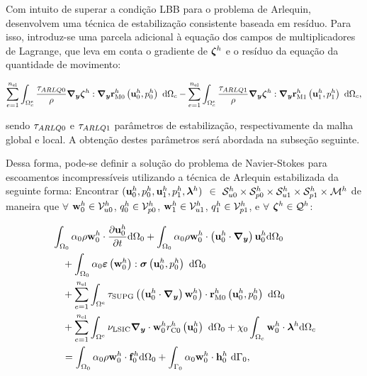 \documentclass[tese_patricia]{subfiles}
\begin{document}
Com intuito de superar a condição LBB para o problema de Arlequin,  desenvolvem uma técnica de estabilização consistente baseada em resíduo. Para isso, introduz-se uma parcela adicional à equação dos campos de multiplicadores de Lagrange, que leva em conta o gradiente de $\boldsymbol{\zeta}^h$ e o resíduo da equação da quantidade de movimento:

\begin{align}
	\sum_{e=1}^{n_{\mathrm{el}}} \int_{\Omega^e_{c}} \frac{\tau_{ARLQ0}}{\rho} \boldsymbol{\nabla_y} \boldsymbol{\zeta}^h : \boldsymbol{\nabla_y} \mathbf{r}_{\mathrm{M0}}^{h}\left(\mathbf{u}_0^h,p_0^h \right) \ \mathrm{d} \Omega_c - 
	\sum_{e=1}^{n_{\mathrm{el}}} \int_{\Omega^e_{c}} \frac{\tau_{ARLQ1}}{\rho} \boldsymbol{\nabla_y} \boldsymbol{\zeta}^h : \boldsymbol{\nabla_y} \mathbf{r}_{\mathrm{M1}}^{h}\left(\mathbf{u}_1^h,p_1^h \right) \ \mathrm{d} \Omega_c,
\end{align}

\noindent sendo $\tau_{ARLQ0}$ e $\tau_{ARLQ1}$ parâmetros de estabilização, respectivamente da malha global e local. A obtenção destes parâmetros será abordada na subseção seguinte. 

Dessa forma, pode-se definir a solução do problema de Navier-Stokes para escoamentos incompressíveis utilizando a técnica de Arlequin estabilizada da seguinte forma: Encontrar $(\mathbf{u}_0^h,p_0^h,\mathbf{u}_1^h,p_1^h,\boldsymbol{\lambda}^h)$ $\in$ $\mathcal{S}_{u0}^h \times \mathcal{S}_{p0}^h \times \mathcal{S}_{u1}^h \times \mathcal{S}_{p1}^h \times \mathcal{M}^h$ de maneira que  $\forall$ $\mathbf{w}_0^h \in \mathcal{V}_{u0}^h$, $q_0^h \in \mathcal{V}_{p0}^h$, $\mathbf{w}_1^h \in \mathcal{V}_{u1}^h$, $q_1^h \in \mathcal{V}_{p1}^h$,   e $\forall$ $\boldsymbol{\zeta}^h \in \mathcal{Q}^h$:

\begin{align}
	\begin{split}
		&\int_{\globalModel} \arlequinWFGlobal \density \wglobalh \cdot \frac{\partial\uglobalh}{\partial t} \deriv \globalModel +
		\int_{\globalModel} \arlequinWFGlobal \density \wglobalh \cdot  \left(\uglobalh \cdot \gradient \right) \uglobalh \deriv \globalModel  \\ 
		&\quad+	
		\int_{\globalModel} \arlequinWFGlobal \straintensor \left(\wglobalh\right) : \stresstensor \left(\uglobalh,\pglobalh\right)\ \deriv \globalModel \\
		&\quad+ \sum_{e=1}^{\nel} \int_{\domainE} \SUPG  \left(\left(\uglobalh \cdot \gradient \right) \wglobalh\right) \cdot \resMomGlobal\left(\uglobalh,\pglobalh \right)\  \deriv \globalModel \\ 
		&\quad+\sum_{e=1}^{\nel} \int_{\domainE} \LSIC \divergence \cdot \wglobalh \resPreGlobal 
		\left(\uglobalh\right)\  \deriv \globalModel 
		+ \chi_{0} \int_{\gluingZone} \wglobalh \cdot \lagrangeMultiplierh \deriv \gluingZone   \\ 
		&\quad = \int_{\globalModel} \arlequinWFGlobal \density \wglobalh \cdot  \globalsbodyforceh \deriv \globalModel + \int_{\globalBoundary} \arlequinWFGlobal \wglobalh  \cdot \globalSurfaceLoadh\ \deriv \globalBoundary,
		\label{eq:QM_forma_fraca_0_atu}
	\end{split}
\end{align}
\end{document}
